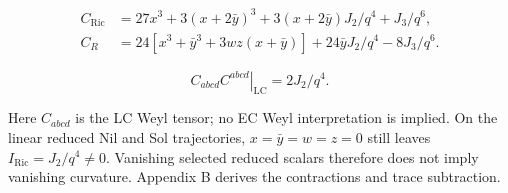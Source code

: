 \begin{equation}\tag{I-03}\label{eq:I-03}
\begin{aligned}
C_{\mathrm{Ric}}&=27x^3+3(x+2\bar y)^3
 +3(x+2\bar y)J_2/q^4+J_3/q^6,\\
C_R&=24[x^3+\bar y^3+3wz(x+\bar y)]
 +24\bar y J_2/q^4-8J_3/q^6.
\end{aligned}
\end{equation}

\begin{equation}\tag{I-04}\label{eq:I-04}
\left.C_{abcd}C^{abcd}\right|_{\mathrm{LC}}=2J_2/q^4.
\end{equation}

Here $C_{abcd}$ is the LC Weyl tensor; no EC Weyl interpretation is implied. On the linear reduced Nil and Sol trajectories, $x=\bar y=w=z=0$ still leaves $I_{\mathrm{Ric}}=J_2/q^4\ne0$. Vanishing selected reduced scalars therefore does not imply vanishing curvature. Appendix B derives the contractions and trace subtraction.
